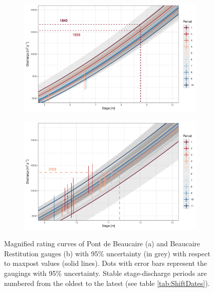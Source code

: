 \documentclass[11pt]{article}
\begin{document}
	\begin{figure}
		\centering
		\begin{subfigure}{.8\textwidth}
            \centering
            \includegraphics[width=\linewidth]{Supplementary/RC_Pt_zoom.pdf}
            \caption{}
            \label{subfig:RcPtZoom}
        \end{subfigure}
        \begin{subfigure}{0.8\textwidth}	
            \centering
            \includegraphics[width=\linewidth]{Supplementary/RC_Res_zoom.pdf}
            \caption{}
            \label{subfig:RcResZoom}
        \end{subfigure}
        \caption{Magnified rating curves of Pont de Beaucaire (a) and Beaucaire Restitution gauges (b) with 95\% uncertainty (in grey) with respect to maxpost values (solid lines). Dots with error bars represent the gaugings with 95\% uncertainty. Stable stage-discharge periods are numbered from the oldest to the latest (see table \ref{tab:ShiftDates}).}
	\end{figure}
	
\end{document}

